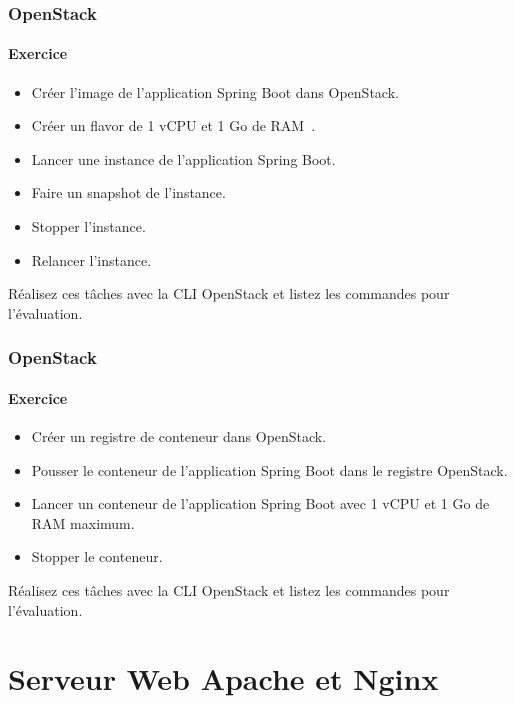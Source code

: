 \documentclass{beamer}
\begin{document}
    \begin{frame}
        \transdissolve
        \frametitle{OpenStack}
        \framesubtitle{Exercice \execcounterdispinc{}}
        \begin{itemize}
            \item Créer l'image de l'application Spring Boot dans OpenStack.
            \item Créer un flavor de 1 vCPU et 1 Go de RAM~.
            \item Lancer une instance de l'application Spring Boot.
            \item Faire un snapshot de l'instance.
            \item Stopper l'instance.
            \item Relancer l'instance.
        \end{itemize}
        Réalisez ces tâches avec la CLI OpenStack et listez les commandes pour l'évaluation.
    \end{frame}

    \begin{frame}
        \transdissolve
        \frametitle{OpenStack}
        \framesubtitle{Exercice \execcounterdispinc{}}
        \begin{itemize}
            \item Créer un registre de conteneur dans OpenStack.
            \item Pousser le conteneur de l'application Spring Boot dans le registre OpenStack.
            \item Lancer un conteneur de l'application Spring Boot avec 1 vCPU et 1 Go de RAM maximum.
            \item Stopper le conteneur.
        \end{itemize}
        Réalisez ces tâches avec la CLI OpenStack et listez les commandes pour l'évaluation.
    \end{frame}


    \section{Serveur Web Apache et Nginx}\label{sec:serveur-web-apache-et-nginx}
\end{document}
